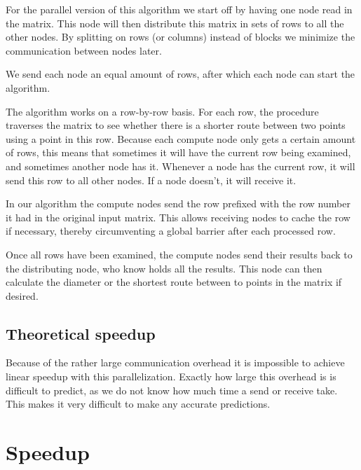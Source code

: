 \documentclass[a4paper,11pt]{article}
\begin{document}
For the parallel version of this algorithm we start off by having one node read in the matrix. This node will then distribute this matrix in sets of rows to all the other nodes. By splitting on rows (or columns) instead of blocks we minimize the communication between nodes later. 

We send each node an equal amount of rows, after which each node can start the algorithm. 

The algorithm works on a row-by-row basis. For each row, the procedure traverses the matrix to see whether there is a shorter route between two points using a point in this row. Because each compute node only gets a certain amount of rows, this means that sometimes it will have the current row being examined, and sometimes another node has it. Whenever a node has the current row, it will send this row to all other nodes. If a node doesn't, it will receive it. 

In our algorithm the compute nodes send the row prefixed with the row number it had in the original input matrix. This allows receiving nodes to cache the row if necessary, thereby circumventing a global barrier after each processed row. 

Once all rows have been examined, the compute nodes send their results back to the distributing node, who know holds all the results. This node can then calculate the diameter or the shortest route between to points in the matrix if desired. 

\subsection{Theoretical speedup}

Because of the rather large communication overhead it is impossible to achieve linear speedup with this parallelization. Exactly how large this overhead is is difficult to predict, as we do not know how much time a send or receive take. This makes it very difficult to make any accurate predictions.

\section{Speedup}

\noindent
\end{document}
